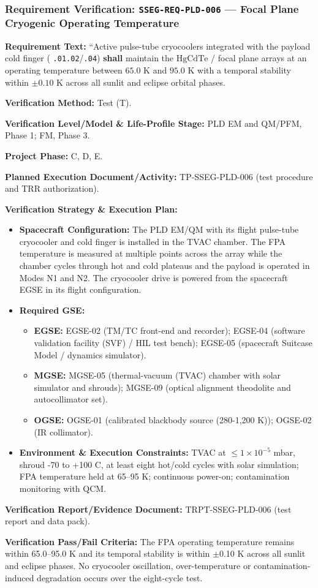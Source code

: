 \subsubsection{Requirement Verification: \texttt{SSEG-REQ-PLD-006} --- Focal Plane Cryogenic Operating Temperature}
\label{ver:SSEG-REQ-PLD-006}
\textbf{Requirement Text:} ``Active pulse-tube cryocoolers integrated with the payload cold finger ( \texttt{.01.02}/\texttt{.04}) \textbf{shall} maintain the $\mathrm{HgCdTe}$ / focal plane arrays at an operating temperature between $65.0\text{ K}$ and $95.0\text{ K}$ with a temporal stability within $\pm 0.10\text{ K}$ across all sunlit and eclipse orbital phases.
\par\textbf{Verification Method:} Test (T).
\par\textbf{Verification Level/Model \& Life-Profile Stage:} PLD EM and QM/PFM, Phase 1; FM, Phase 3.
\par\textbf{Project Phase:} C, D, E.
\par\textbf{Planned Execution Document/Activity:} TP-SSEG-PLD-006 (test procedure and TRR authorization).
\par\textbf{Verification Strategy \& Execution Plan:}
\begin{itemize}
\item \textbf{Spacecraft Configuration:} The PLD EM/QM with its flight pulse-tube cryocooler and cold finger is installed in the TVAC chamber. The FPA temperature is measured at multiple points across the array while the chamber cycles through hot and cold plateaus and the payload is operated in Modes N1 and N2. The cryocooler drive is powered from the spacecraft EGSE in its flight configuration.
\item \textbf{Required GSE:}
\begin{itemize}
\item \textbf{EGSE:} EGSE-02 (TM/TC front-end and recorder); EGSE-04 (software validation facility (SVF) / HIL test bench); EGSE-05 (spacecraft Suitcase Model / dynamics simulator).
\item \textbf{MGSE:} MGSE-05 (thermal-vacuum (TVAC) chamber with solar simulator and shrouds); MGSE-09 (optical alignment theodolite and autocollimator set).
\item \textbf{OGSE:} OGSE-01 (calibrated blackbody source (280-1,200 K)); OGSE-02 (IR collimator).
\end{itemize}
\item \textbf{Environment \& Execution Constraints:} TVAC at $\le$$1\times10^{-5}$ mbar, shroud -70 to +100 C, at least eight hot/cold cycles with solar simulation; FPA temperature held at 65--95 K; continuous power-on; contamination monitoring with QCM.
\end{itemize}
\par\textbf{Verification Report/Evidence Document:} TRPT-SSEG-PLD-006 (test report and data pack).
\par\textbf{Verification Pass/Fail Criteria:} The FPA operating temperature remains within 65.0--95.0 K and its temporal stability is within $\pm$0.10 K across all sunlit and eclipse phases. No cryocooler oscillation, over-temperature or contamination-induced degradation occurs over the eight-cycle test.
\par\medskip
